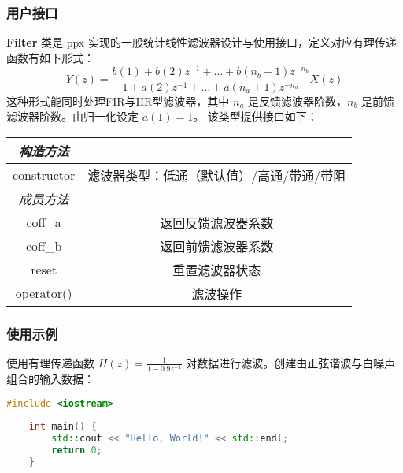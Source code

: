 \subsubsection{用户接口}
\textbf{Filter} 类是 ppx 实现的一般统计线性滤波器设计与使用接口，定义对应有理传递函数有如下形式：
$$
    Y(z)=\frac{b(1)+b(2) z^{-1}+\ldots+b\left(n_{b}+1\right) z^{-n_b}}{1+a(2) z^{-1}+\ldots+a\left(n_{a}+1\right) z^{-n_{a}}} X(z)
$$
这种形式能同时处理FIR与IIR型滤波器，其中 $n_a$ 是反馈滤波器阶数，$n_b$ 是前馈滤波器阶数。由归一化设定 $a(1)=1$。
该类型提供接口如下：
\begin{table}[!h]
    \centering
    \begin{tabular}{cc}
        \toprule
        \emph{构造方法} &                        \\
        \midrule
        constructor & 滤波器类型：低通（默认值）/高通/带通/带阻 \\
        \midrule
        \emph{成员方法} &                        \\
        \midrule
        coff\_a     & 返回反馈滤波器系数              \\
        coff\_b     & 返回前馈滤波器系数              \\
        reset       & 重置滤波器状态                \\
        operator()  & 滤波操作                   \\
        \bottomrule
    \end{tabular}
\end{table}

\subsubsection{使用示例}
使用有理传递函数 $H(z)=\frac{1}{1-0.9z^{-1}}$ 对数据进行滤波。创建由正弦谐波与白噪声组合的输入数据：

\begin{lstlisting}[language=C++]
    #include <iostream>
    
    int main() {
        std::cout << "Hello, World!" << std::endl;
        return 0;
    } 
\end{lstlisting}
\newpage

